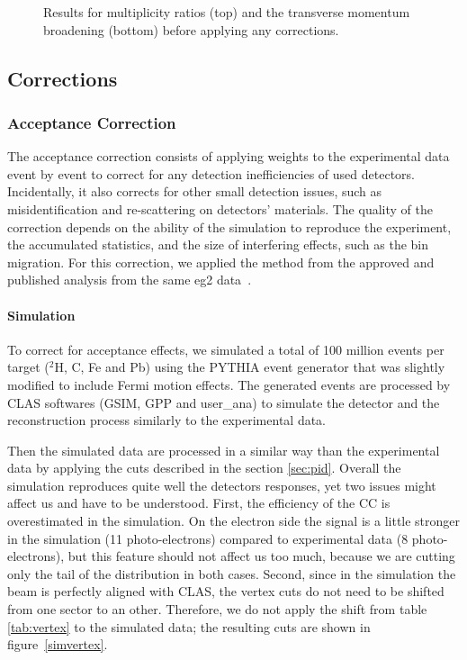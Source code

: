\begin{figure}[htb]
\caption {Results for multiplicity ratios (top) and the transverse momentum 
broadening (bottom) before applying any corrections.}
\label{fig:prelim}
\end{figure}


\subsection{Corrections}
\label{sec:corrections}

\subsubsection{Acceptance Correction}
\label{sec:accept}

The acceptance correction consists of applying weights to the experimental data
event by event to correct for any detection inefficiencies of used detectors.
Incidentally, it also corrects for other small detection issues, such as misidentification and re-scattering on detectors' materials. The quality 
of the correction depends on the ability of the simulation to reproduce the 
experiment, the accumulated statistics, and the size of interfering effects, such 
as the bin migration. For this correction, we applied the method from the 
approved and published analysis from the same eg2 data~\cite{ElFassi:2008}.

\paragraph{Simulation}
\label{sec:simul}

To correct for acceptance effects, we simulated a total of 100 million events 
per target ($^2$H, C, Fe and Pb) using the PYTHIA \cite{Sjostrand:2006za} 
event generator that was slightly modified to include Fermi motion effects. The 
generated events are processed by CLAS softwares (GSIM, GPP and user\_ana) 
to simulate the detector and the reconstruction process similarly to the experimental data.

Then the simulated data are processed in a similar way than the experimental data by 
applying the cuts described in the section \ref{sec:pid}. Overall the 
simulation reproduces quite well the detectors responses, yet two issues might 
affect us and have to be understood. First, the efficiency of the CC is 
overestimated in the simulation. On the electron side the signal is a little stronger in the simulation (11 
photo-electrons) compared to experimental data (8 photo-electrons), but this 
feature should not affect us too much, because we are cutting only the tail of the 
distribution in both cases. Second, since in the simulation the beam is perfectly aligned with CLAS, the vertex cuts do not need to be shifted from one sector to an other. Therefore, we do not apply the shift from table \ref{tab:vertex} to the simulated data; the resulting cuts are shown in figure~\ref{simvertex}.

